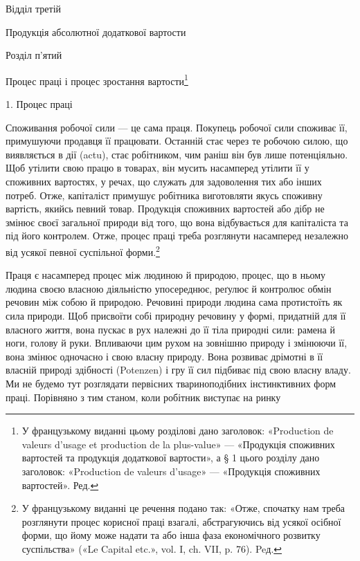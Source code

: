 Відділ третій

Продукція абсолютної додаткової вартости

Розділ п’ятий

Процес праці і процес зростання вартости\footnote*{
У французькому виданні цьому розділові дано заголовок: «Production
de valeurs d’usage et production de la plus-value» — «Продукція
споживних вартостей та продукція додаткової вартости», а § 1 цього розділу
дано заголовок: «Production de valeurs d’usage» — «Продукція споживних
вартостей». Ред.
}

1. Процес праці

Споживання робочої сили — це сама праця. Покупець робочої
сили споживає її, примушуючи продавця її працювати. Останній
стає через те робочою силою, що виявляється в дії (actu),
стає робітником, чим раніш він був лише потенціяльно. Щоб
утілити свою працю в товарах, він мусить насамперед утілити
її у споживних вартостях, у речах, що служать для задоволення
тих або інших потреб. Отже, капіталіст примушує робітника
виготовляти якусь споживну вартість, якийсь певний товар.
Продукція споживних вартостей або дібр не змінює своєї загальної
природи від того, що вона відбувається для капіталіста та
під його контролем. Отже, процес праці треба розглянути насамперед
незалежно від усякої певної суспільної форми.\footnote*{
У французькому виданні це речення подано так: «Отже, спочатку
нам треба розглянути процес корисної праці взагалі, абстрагуючись
від усякої осібної форми, що йому може надати та або інша фаза економічного
розвитку суспільства» («Le Capital etc.», vol. I, ch. VII, p. 76). Peд.
}

Праця є насамперед процес між людиною й природою, процес,
що в ньому людина своєю власною діяльністю упосереднює, реґулює
й контролює обмін речовин між собою й природою. Речовині
природи людина сама протистоїть як сила природи. Щоб
присвоїти собі природну речовину у формі, придатній для її власного
життя, вона пускає в рух належні до її тіла природні сили:
рамена й ноги, голову й руки. Впливаючи цим рухом на зовнішню
природу і змінюючи її, вона змінює одночасно і свою власну природу.
Вона розвиває дрімотні в її власній природі здібності (Potenzen)
і гру її сил підбиває під свою власну владу. Ми не будемо
тут розглядати первісних твариноподібних інстинктивних форм
праці. Порівняно з тим станом, коли робітник виступає на ринку
\parbreak{}  %
